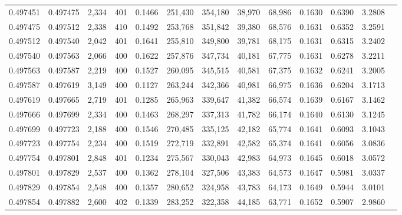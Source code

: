 \begin{tabular}{rrrrrrrrrrrrr}
0.497451 & 0.497475 & 2,334 & 401 &                                     0.1466 & 251,430 & 354,180 &  38,970 &  68,986 & 0.1630 & 0.6390 & 3.2808 \\
0.497475 & 0.497512 & 2,338 & 410 &                                     0.1492 & 253,768 & 351,842 &  39,380 &  68,576 & 0.1631 & 0.6352 & 3.2591 \\
0.497512 & 0.497540 & 2,042 & 401 &                                     0.1641 & 255,810 & 349,800 &  39,781 &  68,175 & 0.1631 & 0.6315 & 3.2402 \\
0.497540 & 0.497563 & 2,066 & 400 &                                     0.1622 & 257,876 & 347,734 &  40,181 &  67,775 & 0.1631 & 0.6278 & 3.2211 \\
0.497563 & 0.497587 & 2,219 & 400 &                                     0.1527 & 260,095 & 345,515 &  40,581 &  67,375 & 0.1632 & 0.6241 & 3.2005 \\
0.497587 & 0.497619 & 3,149 & 400 &                                     0.1127 & 263,244 & 342,366 &  40,981 &  66,975 & 0.1636 & 0.6204 & 3.1713 \\
0.497619 & 0.497665 & 2,719 & 401 &                                     0.1285 & 265,963 & 339,647 &  41,382 &  66,574 & 0.1639 & 0.6167 & 3.1462 \\
0.497666 & 0.497699 & 2,334 & 400 &                                     0.1463 & 268,297 & 337,313 &  41,782 &  66,174 & 0.1640 & 0.6130 & 3.1245 \\
0.497699 & 0.497723 & 2,188 & 400 &                                     0.1546 & 270,485 & 335,125 &  42,182 &  65,774 & 0.1641 & 0.6093 & 3.1043 \\
0.497723 & 0.497754 & 2,234 & 400 &                                     0.1519 & 272,719 & 332,891 &  42,582 &  65,374 & 0.1641 & 0.6056 & 3.0836 \\
0.497754 & 0.497801 & 2,848 & 401 &                                     0.1234 & 275,567 & 330,043 &  42,983 &  64,973 & 0.1645 & 0.6018 & 3.0572 \\
0.497801 & 0.497829 & 2,537 & 400 &                                     0.1362 & 278,104 & 327,506 &  43,383 &  64,573 & 0.1647 & 0.5981 & 3.0337 \\
0.497829 & 0.497854 & 2,548 & 400 &                                     0.1357 & 280,652 & 324,958 &  43,783 &  64,173 & 0.1649 & 0.5944 & 3.0101 \\
0.497854 & 0.497882 & 2,600 & 402 &                                     0.1339 & 283,252 & 322,358 &  44,185 &  63,771 & 0.1652 & 0.5907 & 2.9860 \\

\end{tabular}
